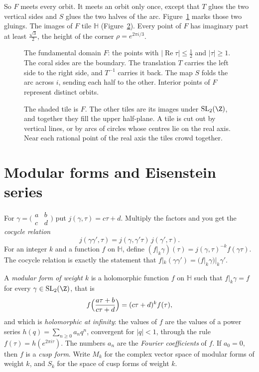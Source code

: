 So $F$ meets every orbit. It meets an orbit only once, except that $T$ glues the two vertical sides and $S$ glues the two halves of the arc. Figure~\ref{fig:newdomain} marks those two gluings. The images of $F$ tile $\mathbb H$ (Figure~\ref{fig:tessellation}). Every point of $F$ has imaginary part at least $\frac{\sqrt3}2$, the height of the corner $\rho=e^{2\pi i/3}$.

\begin{figure}[ht]
\centering
{}
\caption{The fundamental domain $F$: the points with $|\operatorname{Re}\tau|\le\frac12$ and $|\tau|\ge1$. The coral sides are the boundary. The translation $T$ carries the left side to the right side, and $T^{-1}$ carries it back. The map $S$ folds the arc across $i$, sending each half to the other. Interior points of $F$ represent distinct orbits.}
\label{fig:newdomain}
\end{figure}

\begin{figure}[ht]
\centering
{}
\caption{The shaded tile is $F$. The other tiles are its images under $\mathrm{SL}_2(\Z)$, and together they fill the upper half-plane. A tile is cut out by vertical lines, or by arcs of circles whose centres lie on the real axis. Near each rational point of the real axis the tiles crowd together.}
\label{fig:tessellation}
\end{figure}

\section{Modular forms and Eisenstein series}

For $\gamma=\bigl(\begin{smallmatrix}a&b\\c&d\end{smallmatrix}\bigr)$ put $j(\gamma,\tau)=c\tau+d$. Multiply the factors and you get the \emph{cocycle relation}
\[
j(\gamma\gamma',\tau)=j(\gamma,\gamma'\tau)\,j(\gamma',\tau).
\]
For an integer $k$ and a function $f$ on $\mathbb H$, define $(f|_k\gamma)(\tau)=j(\gamma,\tau)^{-k}f(\gamma\tau)$. The cocycle relation is exactly the statement that $f|_k(\gamma\gamma')=(f|_k\gamma)|_k\gamma'$.

\begin{definition}\label{def:modform}
A \emph{modular form of weight $k$} is a holomorphic function $f$ on $\mathbb H$ such that $f|_k\gamma=f$ for every $\gamma\in\mathrm{SL}_2(\Z)$, that is
\[
f\Bigl(\frac{a\tau+b}{c\tau+d}\Bigr)=(c\tau+d)^kf(\tau),
\]
and which is \emph{holomorphic at infinity}: the values of $f$ are the values of a power series $h(q)=\sum_{n\ge0}a_nq^n$, convergent for $|q|<1$, through the rule $f(\tau)=h(e^{2\pi i\tau})$. The numbers $a_n$ are the \emph{Fourier coefficients} of $f$. If $a_0=0$, then $f$ is a \emph{cusp form}. Write $M_k$ for the complex vector space of modular forms of weight $k$, and $S_k$ for the space of cusp forms of weight $k$.
\end{definition}

